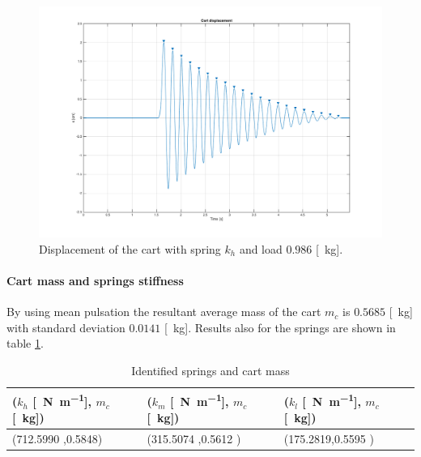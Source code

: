 \begin{figure}[!h]
    \centering
    \includegraphics[width=1\textwidth]{img/cart_detached_1.png}
    \caption{Displacement of the cart with spring $k_h$ and load $0.986$ [\SI{}{\kilo \gram}].}
    \label{fig:cart_detached_figure}
\end{figure}
\paragraph{Cart mass and springs stiffness}
By using   mean pulsation the resultant average mass of the cart $m_c$ is $0.5685$ [\SI{}{\kilo\gram}] with standard deviation $  0.0141$ [\SI{}{\kilo \gram}]. Results also for the springs are shown in table \ref{table: cart_springs_mass}.
\begin{table}[!h]
\centering
\label{table: cart_springs_mass}
\begin{tabular}{|l|l|l|}
\hline
{\textbf{($k_h$ [\SI{}{\newton \per \metre}], $m_c$ [\SI{}{\kilo \gram}])}} & \textbf{($k_m$ [\SI{}{\newton \per \metre}], $m_c$ [\SI{}{\kilo \gram}])} & \textbf{($k_l$ [\SI{}{\newton \per \metre}], $m_c$ [\SI{}{\kilo \gram}])} \\ \hline
(712.5990 ,0.5848)              & (315.5074 ,0.5612 )     & (175.2819,0.5595 )     \\ \hline
\end{tabular}
\caption{Identified springs and cart mass}
\end{table}

